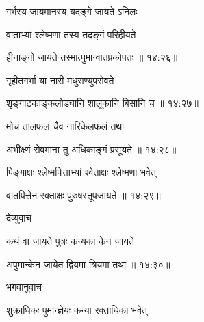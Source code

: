 {\devanagarifont गर्भस्य जायमानस्य यदङ्गे जायते ऽनिलः \thinspace{\danda} \dontdisplaylinenum }%

{\devanagarifont वाताभ्यां श्लेष्मणा तस्य तदङ्गं परिहीयते  \danda\dontdisplaylinenum }%
 

{\devanagarifont हीनाङ्गो जायते तस्मात्पुमान्वातप्रकोपतः {॥ १४:२६॥} \veg\dontdisplaylinenum }%
 
{\devanagarifont गृहीतगर्भा या नारी मधुराण्युपसेवते \thinspace{\dandab} \dontdisplaylinenum }%
 

{\devanagarifont शृङ्गाटकाङ्कलोड्यानि शालूकानि बिसानि च {॥ १४:२७॥} \veg\dontdisplaylinenum }%

{\devanagarifont मोचं तालफलं चैव नारिकेलफलं तथा \thinspace{\dandab} \dontdisplaylinenum }%
 

{\devanagarifont अभीक्ष्णं सेवमाना तु अधिकाङ्गं प्रसूयते {॥ १४:२८॥} \veg\dontdisplaylinenum }%

{\devanagarifont पिङ्गाक्षः श्लेष्मपित्ताभ्यां श्वेताक्षः श्लेष्मणा भवेत् \thinspace{\dandab} \dontdisplaylinenum }%


{\devanagarifont वातपित्तेन रक्ताक्षः पुरुषस्तूपजायते {॥ १४:२९॥} \veg\dontdisplaylinenum }%

{\devanagarifont देव्युवाच {\dandab}\dontdisplaylinenum  }%
 
{\devanagarifont कथं वा जायते पुत्रः कन्यका केन जायते \thinspace{\danda} \dontdisplaylinenum }%
 

{\devanagarifont अपुमान्केन जायेत द्वियमा त्रियमा तथा {॥ १४:३०॥} \veg\dontdisplaylinenum }%
 
{\devanagarifont भगवानुवाच {\dandab}\dontdisplaylinenum  }%
 
{\devanagarifont शुक्राधिकः पुमान्ज्ञेयः कन्या रक्ताधिका भवेत् \thinspace{\danda} \dontdisplaylinenum }%


